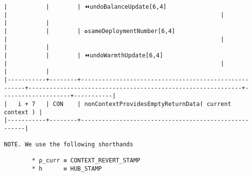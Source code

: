 \documentclass[varwidth=\maxdimen,margin=0.5cm,multi={verbatim}]{standalone}
\begin{document}
\begin{verbatim}
|           |        | ⏪undoBalanceUpdate[6,4]                             |                                                             |                    |           |
|           |        | ♻️sameDeploymentNumber[6,4]                          |                                                             |                    |           |
|           |        | ⏪undoWarmthUpdate[6,4]                              |                                                             |                    |           |
|-----------+--------+------------------------------------------------------+-------------------------------------------------------------+--------------------+-----------|
|   i + 7   | CON    | nonContextProvidesEmptyReturnData( current context ) |
|-----------+--------+------------------------------------------------------|

NOTE. We use the following shorthands

        * ρ_curr ≡ CONTEXT_REVERT_STAMP
        * h      ≡ HUB_STAMP

\end{verbatim}
\end{document}
